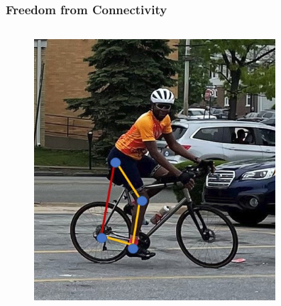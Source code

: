 \begin{frame}
	\frametitle{Freedom from Connectivity}			
	\begin{tcolorbox}[colframe=blue!80!green, title=A (Hacked) Four-Bar Linkage, coltitle=white!80,toggle enlargement=none]
		\begin{columns}[b]
			\begin{column}{.45\linewidth}			
				\begin{figure}
					\centering 
					\includegraphics[width=\textwidth]{figures/4bar_me.jpg}
				\end{figure}
			\end{column}
		\begin{column}{.45\linewidth}			
			\begin{figure}
			\centering 

\end{figure}
\end{column}
\end{columns}
\end{tcolorbox}
\end{frame}

